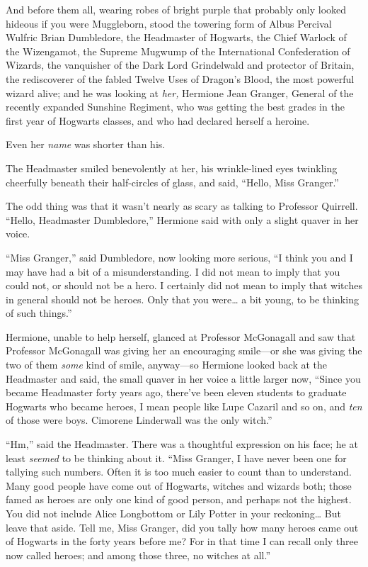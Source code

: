 And before them all, wearing robes of bright purple that probably only
looked hideous if you were Muggleborn, stood the towering form of Albus
Percival Wulfric Brian Dumbledore, the Headmaster of Hogwarts, the Chief
Warlock of the Wizengamot, the Supreme Mugwump of the International
Confederation of Wizards, the vanquisher of the Dark Lord Grindelwald
and protector of Britain, the rediscoverer of the fabled Twelve Uses of
Dragon's Blood, the most powerful wizard alive; and he was looking at
\emph{her,} Hermione Jean Granger, General of the recently expanded
Sunshine Regiment, who was getting the best grades in the first year of
Hogwarts classes, and who had declared herself a heroine.

Even her \emph{name} was shorter than his.

The Headmaster smiled benevolently at her, his wrinkle-lined eyes
twinkling cheerfully beneath their half-circles of glass, and said,
``Hello, Miss Granger.''

The odd thing was that it wasn't nearly as scary as talking to Professor
Quirrell. ``Hello, Headmaster Dumbledore,'' Hermione said with only a
slight quaver in her voice.

``Miss Granger,'' said Dumbledore, now looking more serious, ``I think
you and I may have had a bit of a misunderstanding. I did not mean to
imply that you could not, or should not be a hero. I certainly did not
mean to imply that witches in general should not be heroes. Only that
you were\ldots{} a bit young, to be thinking of such things.''

Hermione, unable to help herself, glanced at Professor McGonagall and
saw that Professor McGonagall was giving her an encouraging smile---or
she was giving the two of them \emph{some} kind of smile, anyway---so
Hermione looked back at the Headmaster and said, the small quaver in her
voice a little larger now, ``Since you became Headmaster forty years
ago, there've been eleven students to graduate Hogwarts who became
heroes, I mean people like Lupe Cazaril and so on, and \emph{ten} of
those were boys. Cimorene Linderwall was the only witch.''

``Hm,'' said the Headmaster. There was a thoughtful expression on his
face; he at least \emph{seemed} to be thinking about it. ``Miss Granger,
I have never been one for tallying such numbers. Often it is too much
easier to count than to understand. Many good people have come out of
Hogwarts, witches and wizards both; those famed as heroes are only one
kind of good person, and perhaps not the highest. You did not include
Alice Longbottom or Lily Potter in your reckoning\ldots{} But leave that
aside. Tell me, Miss Granger, did you tally how many heroes came out of
Hogwarts in the forty years before me? For in that time I can recall
only three now called heroes; and among those three, no witches at
all.''

